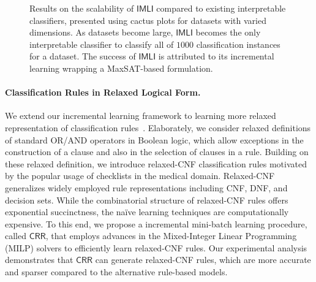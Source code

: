 \documentclass{article}
\begin{document}
\begin{figure}[!b]
		
		\caption{Results on the scalability of $ \mathsf{IMLI} $ compared to existing interpretable classifiers, presented using cactus plots for datasets with varied dimensions. As datasets become large, $ \mathsf{IMLI} $ becomes the only interpretable classifier to classify all of $ 1000 $ classification instances for a dataset. The success of $ \mathsf{IMLI} $ is attributed to its incremental learning wrapping a MaxSAT-based formulation.}
		\label{fig:scalability_imli}
	\end{figure}
	
	
	\paragraph{Classification Rules in Relaxed Logical Form.} We extend our incremental learning framework to learning more relaxed representation of classification rules~\cite{ghosh2020classification}. Elaborately, we consider relaxed definitions of standard OR/AND operators in Boolean logic, which allow exceptions in the construction of a clause and also in the selection of clauses in a rule. Building on these relaxed definition, we introduce relaxed-CNF classification rules motivated by the popular usage of checklists in the medical domain. Relaxed-CNF generalizes widely employed rule representations including CNF, DNF, and decision sets. While the combinatorial structure of relaxed-CNF rules offers exponential succinctness, the na\"ive learning techniques are computationally expensive. To this end, we propose a incremental mini-batch learning procedure, called $ \mathsf{CRR} $, that employs advances in the Mixed-Integer Linear Programming (MILP) solvers to efficiently learn relaxed-CNF rules. Our experimental analysis demonstrates that $ \mathsf{CRR} $ can generate relaxed-CNF rules, which are more accurate and sparser compared to the alternative rule-based models.
	
\end{document}

